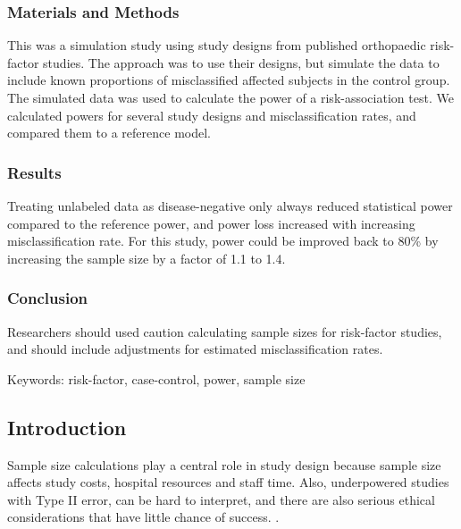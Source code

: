 \documentclass[
]{article}
\begin{document}
\hypertarget{materials-and-methods}{%
\subsubsection{Materials and Methods}\label{materials-and-methods}}

This was a simulation study using study designs from published
orthopaedic risk-factor studies. The approach was to use their designs,
but simulate the data to include known proportions of misclassified
affected subjects in the control group. The simulated data was used to
calculate the power of a risk-association test. We calculated powers for
several study designs and misclassification rates, and compared them to
a reference model.

\hypertarget{results}{%
\subsubsection{Results}\label{results}}

Treating unlabeled data as disease-negative only always reduced
statistical power compared to the reference power, and power loss
increased with increasing misclassification rate. For this study, power
could be improved back to 80\% by increasing the sample size by a factor
of 1.1 to 1.4.

\hypertarget{conclusion}{%
\subsubsection{Conclusion}\label{conclusion}}

Researchers should used caution calculating sample sizes for risk-factor
studies, and should include adjustments for estimated misclassification
rates.

Keywords: risk-factor, case-control, power, sample size

\newpage

\hypertarget{introduction}{%
\subsection{Introduction}\label{introduction}}

Sample size calculations play a central role in study design because
sample size affects study costs, hospital resources and staff time.
Also, underpowered studies with Type II error, can be hard to interpret,
and there are also serious ethical considerations that have little
chance of success. \cite{ halpern2002continuing, hofmeister2007sample}.
\end{document}
